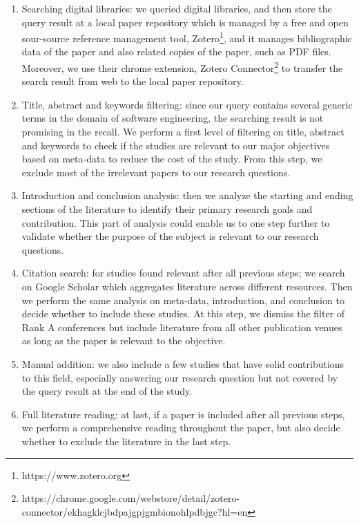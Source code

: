 \begin{enumerate}
\item Searching digital libraries: we queried digital libraries, and then store the query result at a local paper repository which is managed by a free and open sour-source reference management tool, Zotero\footnote{https://www.zotero.org}, and it manages bibliographic data of the paper and also related copies of the paper, such as PDF files. Moreover, we use their chrome extension, Zotero Connector\footnote{https://chrome.google.com/webstore/detail/zotero-connector/ekhagklcjbdpajgpjgmbionohlpdbjgc?hl=en} to transfer the search result from web to the local paper repository.
\item Title, abstract and keywords filtering: since our query contains several generic terms in the domain of software engineering, the searching result is not promising in the recall. We perform a first level of filtering on title, abstract and keywords to check if the studies are relevant to our major objectives based on meta-data to reduce the cost of the study. From this step, we exclude most of the irrelevant papers to our research questions.
\item Introduction and conclusion analysis: then we analyze the starting and ending sections of the literature to identify their primary research goals and contribution. This part of analysis could enable us to one step further to validate whether the purpose of the subject is relevant to our research questions.
\item Citation search: for studies found relevant after all previous steps; we search on Google Scholar which aggregates literature across different resources. Then we perform the same analysis on meta-data, introduction, and conclusion to decide whether to include these studies. At this step, we dismiss the filter of Rank A conferences but include literature from all other publication venues as long as the paper is relevant to the objective.
\item Manual addition: we also include a few studies that have solid contributions to this field, especially answering our research question but not covered by the query result at the end of the study. 
\item Full literature reading: at last, if a paper is included after all previous steps, we perform a comprehensive reading throughout the paper, but also decide whether to exclude the literature in the last step.

\end{enumerate}

